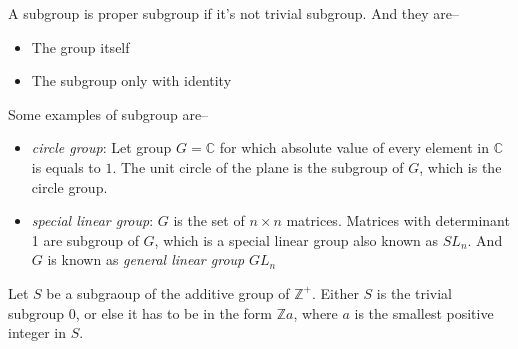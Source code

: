 \documentclass{scrartcl}
\begin{document}
A subgroup is proper subgroup if it's not trivial subgroup. And they are--
\begin{itemize}
	\item The group itself
	\item The subgroup only with identity
\end{itemize}

Some examples of subgroup are--
\begin{itemize}
	\item \textit{circle group}: Let group $G = \mathbb{C}$ for which absolute value of every element in $\mathbb{C}$ is equals to $1$. The unit circle of the plane is the subgroup of $G$, which is the circle group.
	\item \textit{special linear group}: $G $ is the set of $ n \times n$ matrices. Matrices with determinant 1 are subgroup of $G$, which is a special linear group also known as $SL_n$. And $G$ is known as \textit{general linear group} $GL_n$

\end{itemize}
\begin{thm}{}{}
	Let $S$ be a subgraoup of the additive group of $\mathbb{Z^+}$. Either $S$ is the trivial subgroup {0}, or else it has to be in the form $\mathbb{Z}a$, where $a$ is the smallest positive integer in $S$.
\end{thm}
\end{document}
